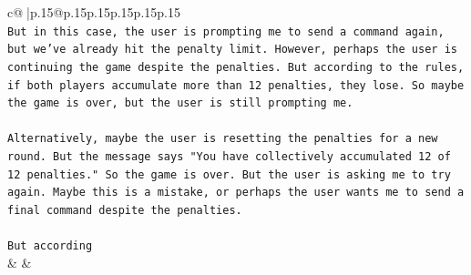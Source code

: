 \documentclass{article}
\begin{document}
{\begin{supertabular}{c@{$\;$}|p{.15\linewidth}@{}p{.15\linewidth}p{.15\linewidth}p{.15\linewidth}p{.15\linewidth}p{.15\linewidth}}
{{{\\ 
\texttt{But in this case, the user is prompting me to send a command again, but we've already hit the penalty limit. However, perhaps the user is continuing the game despite the penalties. But according to the rules, if both players accumulate more than 12 penalties, they lose. So maybe the game is over, but the user is still prompting me.} \\
\\ 
\texttt{Alternatively, maybe the user is resetting the penalties for a new round. But the message says "You have collectively accumulated 12 of 12 penalties." So the game is over. But the user is asking me to try again. Maybe this is a mistake, or perhaps the user wants me to send a final command despite the penalties.} \\
\\ 
\texttt{But according} \\
            }
        }
    }
    & & \\ \\


\end{supertabular}}
\end{document}
